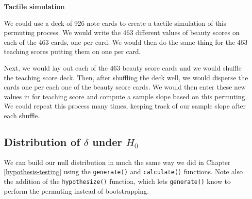 \documentclass[12pt, krantz2,]{krantz}
\makeatletter
\newenvironment{Shaded}{\begin{snugshade}}{\end{snugshade}}
\newcommand{\DataTypeTok}[1]{\textcolor[rgb]{0.27,0.27,0.27}{#1}}
\newcommand{\DecValTok}[1]{\textcolor[rgb]{0.06,0.06,0.06}{#1}}
\newcommand{\KeywordTok}[1]{\textcolor[rgb]{0.27,0.27,0.27}{\textbf{#1}}}
\newcommand{\NormalTok}[1]{#1}
\newcommand{\OperatorTok}[1]{\textcolor[rgb]{0.43,0.43,0.43}{\textbf{#1}}}
\newcommand{\StringTok}[1]{\textcolor[rgb]{0.5,0.5,0.5}{#1}}
\newenvironment{kframe}{%
\medskip{}
\setlength{\fboxsep}{.8em}
 \def\at@end@of@kframe{}%
 \ifinner\ifhmode%
  \def\at@end@of@kframe{\end{minipage}}%
  \begin{minipage}{\columnwidth}%
 \fi\fi%
 \def\FrameCommand##1{\hskip\@totalleftmargin \hskip-\fboxsep
 \colorbox{shadecolor}{##1}\hskip-\fboxsep
     \hskip-\linewidth \hskip-\@totalleftmargin \hskip\columnwidth}%
 \MakeFramed {\advance\hsize-\width
   \@totalleftmargin\z@ \linewidth\hsize
   \@setminipage}}%
 {\par\unskip\endMakeFramed%
 \at@end@of@kframe}
\renewenvironment{Shaded}{\begin{kframe}}{\end{kframe}}
\makeatother
\begin{document}
\textbf{Tactile simulation}

We could use a deck of 926 note cards to create a tactile simulation of this permuting process. We would write the 463 different values of beauty scores on each of the 463 cards, one per card. We would then do the same thing for the 463 teaching scores putting them on one per card.

Next, we would lay out each of the 463 beauty score cards and we would shuffle the teaching score deck. Then, after shuffling the deck well, we would disperse the cards one per each one of the beauty score cards. We would then enter these new values in for teaching score and compute a sample slope based on this permuting. We could repeat this process many times, keeping track of our sample slope after each shuffle.

\hypertarget{distribution-of-delta-under-h_0-1}{%
\subsection{\texorpdfstring{Distribution of \(\delta\) under \(H_0\)}{Distribution of \textbackslash{}delta under H\_0}}\label{distribution-of-delta-under-h_0-1}}

We can build our null distribution in much the same way we did in Chapter \ref{hypothesis-testing} using the \texttt{generate()} and \texttt{calculate()} functions. Note also the addition of the \texttt{hypothesize()} function, which lets \texttt{generate()} know to perform the permuting instead of bootstrapping.

\begin{Shaded}
\end{Shaded}

\begin{Shaded}
\end{Shaded}
\end{document}
